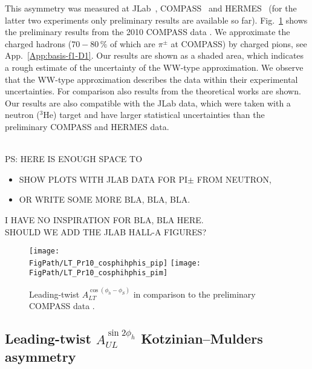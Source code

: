 \documentclass[a4paper,11pt]{article}
\newcommand{\blue}[1]{{\color{blue} #1}}
\newcommand{\red}[1]{{\color{red} #1}}
\newcommand{\ps}[1]{\blue{#1}}
\newcommand*{\FigPath}{./figs}%
\begin{document}
This asymmetry was measured at JLab~\cite{Huang:2011bc}, COMPASS~\cite{
Parsamyan:2007ju,Parsamyan:2015dfa,Parsamyan:2018evv} and HERMES~\cite{Pappalardo:2011cu,Pappalardo:2012zz} (for the latter two experiments only preliminary results are available so far).
 Fig.~\ref{cosphihphis}
shows the preliminary results from the 2010 COMPASS data \cite{Parsamyan:2013fia}.
We approximate the
charged hadrons ($70-80\,\%$ of which are $\pi^\pm$ at COMPASS) by
charged pions, see App.~\ref{App:basis-f1-D1}.
Our results are shown as a shaded area, which indicates a rough estimate
of the uncertainty of the WW-type approximation.
We observe that the WW-type approximation describes the data within
their experimental uncertainties.
For comparison also results from the theoretical works
\cite{Kotzinian:2006dw,Kotzinian:2008fe,Boffi:2009sh} are shown.
Our results are also compatible with the JLab data, which were
taken with a neutron ($^3$He) target \cite{Huang:2011bc} and have
larger statistical uncertainties than the preliminary COMPASS and HERMES data.

\ps{\ \\
PS: HERE IS ENOUGH SPACE TO
\begin{itemize}
\item 	SHOW PLOTS WITH JLAB DATA \cite{Huang:2011bc} FOR PI$\pm$ FROM NEUTRON,
\item	OR WRITE SOME MORE BLA, BLA, BLA.
\end{itemize}
I HAVE NO INSPIRATION FOR BLA, BLA HERE. \\
\red{SHOULD WE ADD THE JLAB HALL-A FIGURES?} \\ }

\begin{figure}[h]
\centering
\texttt{[image: \\FigPath/LT\_Pr10\_cosphihphis\_pip]}
\texttt{[image: \\FigPath/LT\_Pr10\_cosphihphis\_pim]}
	\caption{\label{cosphihphis}
	Leading-twist $A_{LT}^{\cos(\phi_h-\phi_S)}$
	 in comparison to the preliminary COMPASS data \cite{Parsamyan:2013fia}.
	}
\end{figure}



\newpage

\subsection{\boldmath
	Leading-twist $A_{UL}^{\sin2\phi_h}$ Kotzinian--Mulders  asymmetry}
	\label{Sec-6.2:FULsin2phi}
\end{document}
